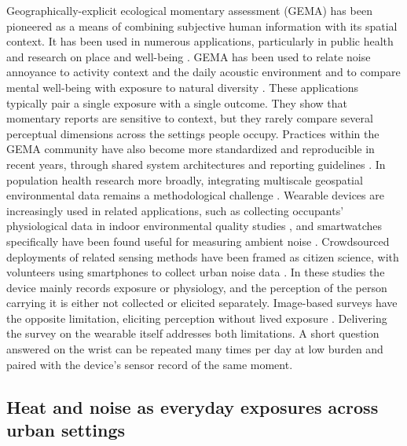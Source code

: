 \documentclass[]{interact}
\begin{document}
Geographically-explicit ecological momentary assessment (GEMA) has been pioneered as a means of combining subjective human information with its spatial context.
It has been used in numerous applications, particularly in public health and research on place and well-being \citep{Kirchner2016-dq}.
GEMA has been used to relate noise annoyance to activity context and the daily acoustic environment \citep{Zhang2020-bq} and to compare mental well-being with exposure to natural diversity \citep{Hammoud2024-pb}.
These applications typically pair a single exposure with a single outcome.
They show that momentary reports are sensitive to context, but they rarely compare several perceptual dimensions across the settings people occupy.
Practices within the GEMA community have also become more standardized and reproducible in recent years, through shared system architectures and reporting guidelines \citep{Gharani2021-hx,Kingsbury2024-qe}.
In population health research more broadly, integrating multiscale geospatial environmental data remains a methodological challenge \citep{Cui2022-si}.
Wearable devices are increasingly used in related applications, such as collecting occupants' physiological data in indoor environmental quality studies \citep{Abboushi2022-ot}, and smartwatches specifically have been found useful for measuring ambient noise \citep{Fischer2022-lv}.
Crowdsourced deployments of related sensing methods have been framed as citizen science, with volunteers using smartphones to collect urban noise data \citep{Zipf2020-br}.
In these studies the device mainly records exposure or physiology, and the perception of the person carrying it is either not collected or elicited separately.
Image-based surveys have the opposite limitation, eliciting perception without lived exposure \citep{Ito2024-fs,Quintana2025-tn}.
Delivering the survey on the wearable itself addresses both limitations.
A short question answered on the wrist can be repeated many times per day at low burden and paired with the device's sensor record of the same moment.

\subsection{Heat and noise as everyday exposures across urban settings}\label{sec:rw-heat-noise}
\end{document}
